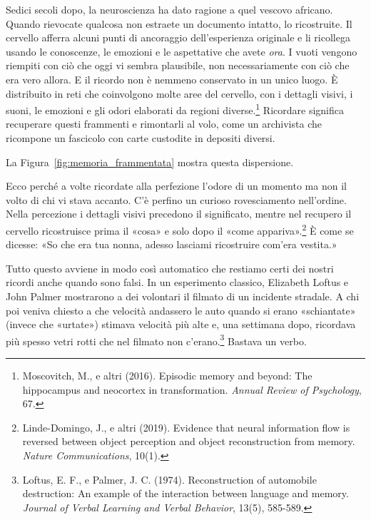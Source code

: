 Sedici secoli dopo, la neuroscienza ha dato ragione a quel vescovo africano. Quando rievocate qualcosa non estraete un documento intatto, lo ricostruite. Il cervello afferra alcuni punti di ancoraggio dell'esperienza originale e li ricollega usando le conoscenze, le emozioni e le aspettative che avete \textit{ora}. I vuoti vengono riempiti con ciò che oggi vi sembra plausibile, non necessariamente con ciò che era vero allora. E il ricordo non è nemmeno conservato in un unico luogo. È distribuito in reti che coinvolgono molte aree del cervello, con i dettagli visivi, i suoni, le emozioni e gli odori elaborati da regioni diverse.\footnote{Moscovitch, M., e altri (2016). Episodic memory and beyond: The hippocampus and neocortex in transformation. \textit{Annual Review of Psychology}, 67.} Ricordare significa recuperare questi frammenti e rimontarli al volo, come un archivista che ricompone un fascicolo con carte custodite in depositi diversi.

La Figura~\ref{fig:memoria_frammentata} mostra questa dispersione.


Ecco perché a volte ricordate alla perfezione l'odore di un momento ma non il volto di chi vi stava accanto. C'è perfino un curioso rovesciamento nell'ordine. Nella percezione i dettagli visivi precedono il significato, mentre nel recupero il cervello ricostruisce prima il «cosa» e solo dopo il «come appariva».\footnote{Linde-Domingo, J., e altri (2019). Evidence that neural information flow is reversed between object perception and object reconstruction from memory. \textit{Nature Communications}, 10(1).} È come se dicesse: «So che era tua nonna, adesso lasciami ricostruire com'era vestita.»

Tutto questo avviene in modo così automatico che restiamo certi dei nostri ricordi anche quando sono falsi. In un esperimento classico, Elizabeth Loftus e John Palmer mostrarono a dei volontari il filmato di un incidente stradale. A chi poi veniva chiesto a che velocità andassero le auto quando si erano «schiantate» (invece che «urtate») stimava velocità più alte e, una settimana dopo, ricordava più spesso vetri rotti che nel filmato non c'erano.\footnote{Loftus, E. F., e Palmer, J. C. (1974). Reconstruction of automobile destruction: An example of the interaction between language and memory. \textit{Journal of Verbal Learning and Verbal Behavior}, 13(5), 585-589.} Bastava un verbo.


